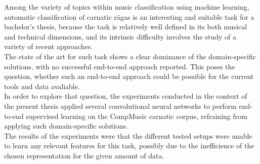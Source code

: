 Among the variety of topics within music classification using machine learning, automatic classification of carnatic r\=agas is an interesting and suitable task for a bachelor's thesis, because the task is relatively well defined in its both musical and technical dimensions, and its intrinsic difficulty involves the study of a variety of recent approaches.\\

The state of the art for such task shows a clear dominance of the domain-specific solutions, with no successful end-to-end approach reported. This poses the question, whether such an end-to-end approach could be possible for the current tools and data avaliable.\\

In order to explore that question, the experiments conducted in the context of the present thesis applied several convolutional neural networks to perform end-to-end supervised learning on the CompMusic carnatic corpus, refraining from applying such domain-specific solutions.\\

The results of the experiments were that the different tested setups were unable to learn any relevant features for this task, possibly due to the inefficience of the chosen representation for the given amount of data.
